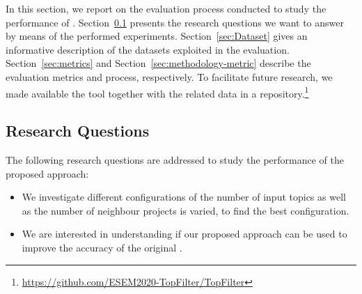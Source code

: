 





In this section, we report on the evaluation process conducted to study the 
performance of \TF. Section~\ref{sec:ResearchQuestions} presents the research 
questions we want to 
answer by means of the performed experiments. 
Section~\ref{sec:Dataset} 
gives an informative description of the datasets exploited in the evaluation. 
Section~\ref{sec:metrics} and Section~\ref{sec:methodology-metric} describe the 
evaluation metrics and process, respectively. %
To facilitate future research, we made available 
the \TF tool together with the related data in a \GH 
repository.\footnote{\url{https://github.com/ESEM2020-TopFilter/TopFilter}}




\subsection{Research Questions} \label{sec:ResearchQuestions}

The following research questions are addressed to study the performance of the 
proposed approach: %

\begin{itemize}
	\item \rqfirst We investigate different configurations of \TF\ie the 
	number of input topics as well as the number of neighbour projects is 
	varied, to find the best configuration. %
	
	\item \rqsecond  We are interested 
	in understanding if our proposed approach can be used to 
	improve the accuracy of the original \MNB. 
\end{itemize}


